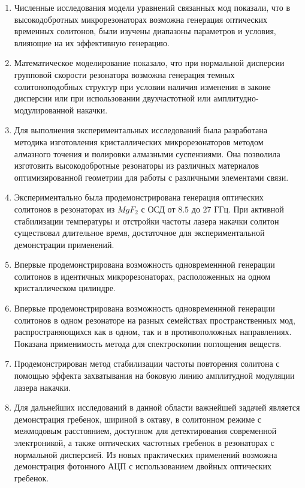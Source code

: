 \begin{enumerate}
  \item Численные исследования модели уравнений связанных мод показали, что в высокодобротных микрорезонаторах возможна генерация оптических временных солитонов, были изучены диапазоны параметров и условия, влияющие на их эффективную генерацию.
  \item Математическое моделирование показало, что при нормальной дисперсии групповой скорости резонатора возможна генерация темных солитоноподобных структур при условии наличия изменения в законе дисперсии или при использовании двухчастотной или амплитудно-модулированной накачки.
  \item Для выполнения экспериментальных исследований была разработана методика изготовления кристаллических микрорезонаторов методом алмазного точения и полировки алмазными суспензиями. Она позволила изготовить высокодобротные резонаторы из различных материалов оптимизированной геометрии для работы с различными элементами связи.
  \item Экспериментально была продемонстрирована генерация оптических солитонов в резонаторах из $MgF_2$ с ОСД от $8.5$ до $27$ ГГц. При активной стабилизации температуры и отстройки частоты лазера накачки солитон существовал длительное время, достаточное для экспериментальной демонстрации применений.
  \item Впервые продемонстрирована возможность одновременнной генерации солитонов в идентичных микрорезонаторах, расположенных на одном кристаллическом цилиндре.
  \item Впервые продемонстрирована возможность одновременнной генерации солитонов в одном резонаторе на разных семействах пространственных мод, распространяющихся как в одном, так и в противоположных направлениях. Показана применимость метода для спектроскопии поглощения веществ.
  \item Продемонстрирован метод стабилизации частоты повторения солитона с помощью эффекта захватывания на боковую линию амплитудной модуляции лазера накачки.
  \item Для дальнейших исследований в данной области важнейшей задачей является демонстрация гребенок, шириной в октаву, в солитонном режиме с межмодовым расстоянием, доступном для детектирования современной электроникой, а также оптических частотных гребенок в резонаторах с нормальной дисперсией. Из новых практических применений возможна демонстрация фотонного АЦП с использованием двойных оптических гребенок.
\end{enumerate}
